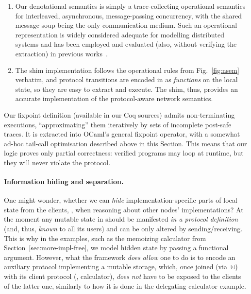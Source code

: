 \begin{enumerate}

\item Our denotational semantics is simply a trace-collecting
  operational semantics for interleaved, asynchronous, message-passing
  concurrency, with the shared message soup being the only
  communication medium. Such an operational representation is widely
  considered adequate for modelling distributed systems and has been
  employed and evaluated (also, without verifying the extraction) in
  previous works~\cite{
    Wilcox-al:PLDI15,Hawblitzel-al:SOSP15,Padon-al:PLDI16}.

\item The shim implementation follows the operational rules from
  Fig.~\ref{fig:nsem} verbatim, and protocol transitions are encoded
  in \disel as \emph{functions} on the local state, so they are easy
  to extract and execute. The shim, thus, provides an accurate
  implementation of the protocol-aware network semantics.

\end{enumerate}

\noindent
%
Our fixpoint definition (available in our Coq sources) admits
non-terminating executions, ``approximating'' them iteratively by sets
of incomplete post-safe traces. It is extracted into OCaml's general
fixpoint operator, with a somewhat ad-hoc tail-call optimisation
described above in this Section. This means that our logic proves only
partial correctness: verified programs may loop at runtime, but they
will never violate the protocol.

\paragraph{Information hiding and separation.~}

One might wonder, whether we can \emph{hide} implementation-specific
parts of local state from the clients, \eg, when reasoning about other
nodes' implementations?
%
At the moment any mutable state in \disel should be manifested
\emph{in a protocol definition} (and, thus, \emph{known} to all its
users) and can be only altered by sending/receiving. This is why in
the examples, such as the memoizing calculator from
Section~\ref{sec:more-impl-free}, we model hidden state by passing a
functional argument. However, what the framework \emph{does allow} one
to do is to encode an auxiliary protocol implementing a mutable
storage, which, once joined (via~$\uplus$) with its client protocol
(\eg, calculator), \emph{does not} have to be exposed to the clients
of the latter one, similarly to how it is done in the delegating
calculator example.

